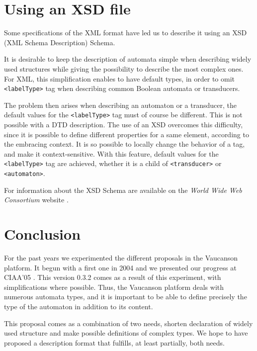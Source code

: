 \documentclass[a4paper]{article}
\newcommand{\Vauc}{{\sc Vaucanson}\xspace}
\newcommand{\xtag}[1]{\texttt{<#1>}}
\begin{document}
\section{Using an XSD file}

Some specifications of the XML format have led us to describe it using an XSD
(XML Schema Description) Schema.

It is desirable to keep the description of automata simple when
describing widely used structures while giving the possibility to
describe the most complex ones. For XML, this simplification enables
to have default types, in order to omit \xtag{labelType} tag when describing
common Boolean automata or transducers.

The problem then arises when describing an automaton or a transducer,
the default values for the \xtag{labelType} tag must of course be different.
This is not possible with a DTD description.  The use of an XSD
overcomes this difficulty, since it is possible to define different
properties for a same element, according to the embracing context. It
is so possible to locally change the behavior of a tag, and make it
context-sensitive. With this feature, default values for the
\xtag{labelType} tag are achieved, whether it is a child of
\xtag{transducer} or \xtag{automaton}.

For information about the XSD Schema are available on the
\textit{World Wide Web Consortium} website \cite{w3c.www}.

\section{Conclusion}

For the past years we experimented the different proposals in the
\Vauc platform. It begun with a first one in 2004 \cite{vaucanson.04.techrep}
and we presented our progress at CIAA'05 \cite{claveirole.05.ciaa}.
This version 0.3.2 comes as a result of this experiment, with
simplifications where possible. Thus, the \Vauc platform deals
with numerous automata types, and it is important to be able to define
precisely the type of the automaton in addition to its content.

This proposal comes as a combination of two needs, shorten declaration
of widely used structure and make possible definitions of complex
types. We hope to have proposed a description format that fulfills, at
least partially, both needs.

\nocite{lombardy.04.tcs}
\cite{claveirole.05.ciaa}
\cite{vaucanson.04.techrep}
\nocite{vaucanson.www.xml}
\cite{vaucanson.www.xsd}
\cite{w3c.www}




\end{document}
